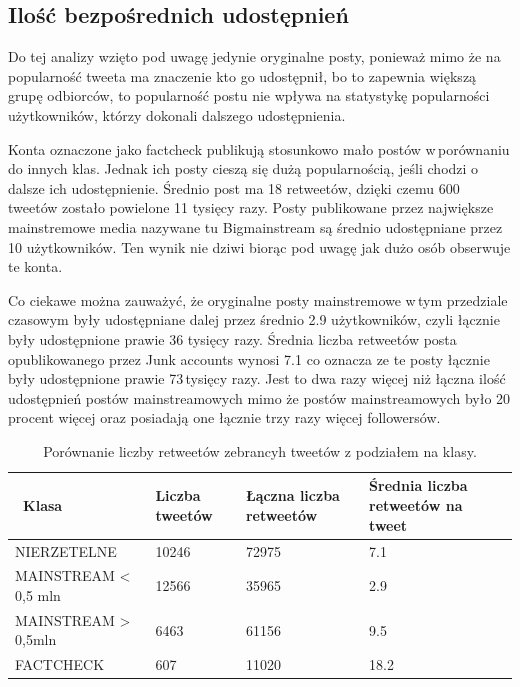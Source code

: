 \subsection{Ilość bezpośrednich udostępnień }
Do tej analizy wzięto pod uwagę jedynie oryginalne posty, ponieważ mimo że na popularność tweeta ma znaczenie kto go udostępnił, bo to zapewnia większą grupę odbiorców, to popularność postu nie wpływa na statystykę popularności użytkowników, którzy dokonali dalszego udostępnienia. 
\par
Konta oznaczone jako factcheck publikują stosunkowo mało postów w\,porównaniu do innych klas. Jednak ich posty cieszą się dużą popularnością, jeśli chodzi o dalsze ich udostępnienie. Średnio post ma 18 retweetów, dzięki czemu 600 tweetów zostało powielone 11 tysięcy razy. Posty publikowane przez największe mainstremowe media nazywane tu Bigmainstream są średnio udostępniane przez 10 użytkowników. Ten wynik nie dziwi biorąc pod uwagę jak dużo osób obserwuje te konta.  
\par
Co ciekawe można zauważyć, że oryginalne posty mainstremowe w\,tym przedziale czasowym były udostępniane dalej przez średnio 2.9 użytkowników, czyli łącznie były udostępnione prawie 36 tysięcy razy. Średnia liczba retweetów posta opublikowanego przez Junk accounts wynosi 7.1 co oznacza ze te posty łącznie były udostępnione prawie 73\,tysięcy razy. Jest to dwa razy więcej niż łączna ilość udostępnień postów mainstreamowych mimo że postów mainstreamowych było 20 procent więcej oraz posiadają one łącznie trzy razy więcej followersów. 


\begin{table}[!h]
\centering
\caption{Porównanie liczby retweetów zebrancyh tweetów z podziałem na klasy.} \label{tab:liczbaretweetow}
\begin{tabular}{|m{}|R{2,5cm}|R{2,5cm}|R{2,5cm}|}  
\hline
~Klasa & Liczba tweetów & Łączna liczba retweetów & Średnia liczba retweetów na tweet \\ 
\hline
NIERZETELNE & 10246 & 72975 & 7.1 \\ 
\hline
MAINSTREAM \textless{} 0,5 mln & 12566 & 35965 & 2.9 \\ 
\hline
MAINSTREAM \textgreater{} 0,5mln & 6463 & 61156 & 9.5 \\ 
\hline
FACTCHECK & 607 & 11020 & 18.2 \\
\hline
\end{tabular}
\end{table}



